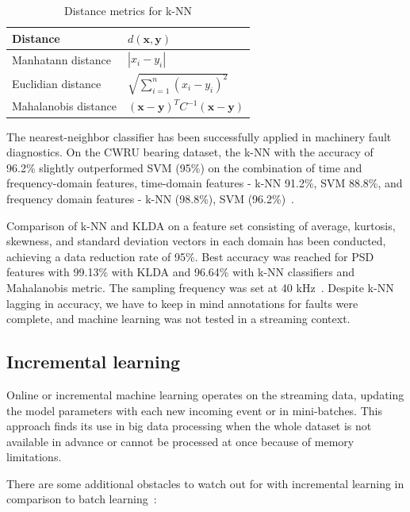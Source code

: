 \begin{table}[ht]
\centering
\renewcommand{\arraystretch}{2}
\begin{tabular}{|l|l|}
\hline
\textbf{Distance}     & \textbf{$d(\mathbf{x}, \mathbf{y})$}                                   \\ \hline
Manhatann distance	 & $ |x_i - y_i| $													   \\ \hline
Euclidian distance    & $ \sqrt{\sum_{i = 1}^{n}(x_i - y_i)^2} $                               \\ \hline
Mahalanobis distance  & $ (\mathbf{x} - \mathbf{y})^T C^{-1} (\mathbf{x} - \mathbf{y}) $       \\ \hline
\end{tabular}
\caption{Distance metrics for k-NN}
\label{tab:KNN-distance}
\end{table}

The nearest-neighbor classifier has been successfully applied in machinery fault diagnostics. On the CWRU bearing dataset, the k-NN with the accuracy of 96.2\% slightly outperformed SVM (95\%) on the combination of time and frequency-domain features, time-domain features - k-NN 91.2\%, SVM 88.8\%, and frequency domain features - k-NN (98.8\%), SVM (96.2\%)~\cite{jamil_feature-based_2021}. 

Comparison of k-NN and KLDA on a feature set consisting of average, kurtosis, skewness, and standard deviation vectors in each domain has been conducted, achieving a data reduction rate of 95\%. Best accuracy was reached for PSD features with 99.13\% with KLDA and 96.64\% with k-NN classifiers and Mahalanobis metric. The sampling frequency was set at 40 kHz~\cite{altaf_new_2022}. Despite k-NN lagging in accuracy, we have to keep in mind annotations for faults were complete, and machine learning was not tested in a streaming context.

\subsection{Incremental learning}
Online or incremental machine learning operates on the streaming data, updating the model parameters with each new incoming event or in mini-batches. This approach finds its use in big data processing when the whole dataset is not available in advance or cannot be processed at once because of memory limitations. 

There are some additional obstacles to watch out for with incremental learning in comparison to batch learning~\cite{gepperth_incremental_2016}:

